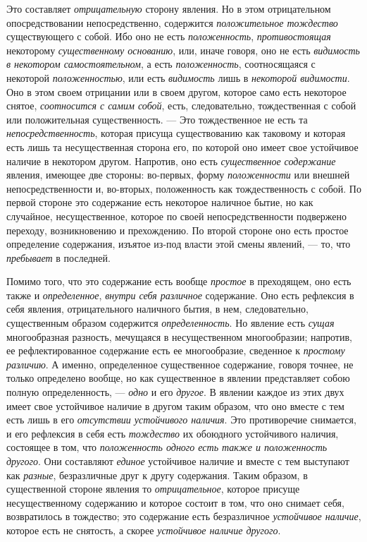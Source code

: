 Это составляет {\em отрицательную} сторону явления. Но в
этом отрицательном опосредствовании непосредственно, содержится
{\em положительное тождество} существующего с собой.
Ибо оно не есть {\em положенность},
{\em противостоящая} некоторому
{\em существенному основанию}, или, иначе говоря, оно
не есть {\em видимость в некотором самостоятельном}, а
есть {\em положенность}, соотносящаяся с некоторой
{\em положенностью}, или есть
{\em видимость} лишь в
{\em некоторой видимости}. Оно в этом своем отрицании
или в своем другом, которое само есть некоторое снятое,
{\em соотносится с самим собой}, есть, следовательно,
тождественная с собой или положительная существенность. — Это тождественное
не есть та {\em непосредственность}, которая присуща
существованию как таковому и которая есть лишь та несущественная сторона
его, по которой оно имеет свое устойчивое наличие в некотором другом.
Напротив, оно есть {\em существенное содержание}
явления, имеющее две стороны: во-первых, форму
{\em положенности} или внешней непосредственности и,
во-вторых, положенность как тождественность с собой. По первой стороне это
содержание есть некоторое наличное бытие, но как случайное, несущественное,
которое по своей непосредственности подвержено переходу, возникновению и
прехождению. По второй стороне оно есть простое определение содержания,
изъятое из-под власти этой смены явлений, — то, что
{\em пребывает} в последней.

Помимо того, что это содержание есть вообще
{\em простое} в преходящем, оно есть также и
{\em определенное}, {\em внутри
себя различное }содержание. Оно есть рефлексия в себя явления,
отрицательного наличного бытия, в нем, следовательно, существенным образом
содержится {\em определенность}. Но явление есть
{\em сущая} многообразная разность, мечущаяся в
несущественном многообразии; напротив, ее рефлектированное содержание есть
ее многообразие, сведенное к {\em простому различию}. А
именно, определенное существенное содержание, говоря точнее, не только
определено вообще, но как существенное в явлении представляет собою полную
определенность, — {\em одно} и его
{\em другое}. В явлении каждое из этих двух имеет свое
устойчивое наличие в другом таким образом, что оно вместе с тем есть лишь в
его {\em отсутствии устойчивого наличия}. Это
противоречие снимается, и его рефлексия в себя есть
{\em тождество} их обоюдного устойчивого наличия,
состоящее в том, что {\em положенность одного есть
также и положенность другого}. Они составляют
{\em единое} устойчивое наличие и вместе с тем
выступают как {\em разные}, безразличные друг к другу
содержания. Таким образом, в существенной стороне явления то
{\em отрицательное}, которое присуще несущественному
содержанию и которое состоит в том, что оно снимает себя, возвратилось в
тождество; это содержание есть безразличное
{\em устойчивое наличие}, которое есть не снятость, а
скорее {\em устойчивое наличие другого}.

